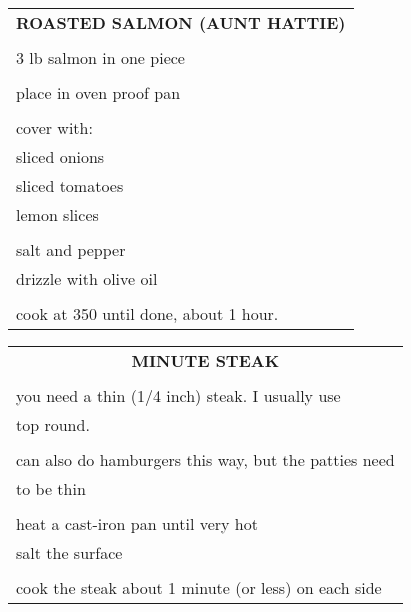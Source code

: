 \documentclass[8pt]{report}
\begin{document}
\begin{tabular}{|l|} \hline	%
 
\multicolumn{1}{|c|}{\textbf{ROASTED SALMON (AUNT HATTIE)}}
\\
\\

\index{fish/meat!roasted salmon (aunt hattie)} \index{roasted salmon}
\index{salmon!roasted}

3 lb salmon in one piece\\
\\
place in oven proof pan\\
\\
cover with:\\
\hspace{0.5 in}	sliced onions\\
\hspace{0.5 in}	sliced tomatoes\\
\hspace{0.5 in}	lemon slices\\
\\
salt and pepper\\
drizzle with olive oil\\
\\
cook at 350 until done, about 1 hour.\\



\hline

\end{tabular}

\newpage


\normalsize

\centering

\begin{tabular}{|l|} \hline	%
 
\multicolumn{1}{|c|}{\textbf{MINUTE STEAK}}
\\
\\

\index{fish/meat!minute steak} \index{minute steak}
\index{steak!minute}

you need a thin (1/4 inch) steak.  I usually use\\
top round.\\
\\
can also do hamburgers this way, but the patties need\\
to be thin\\
\\
heat a cast-iron pan until very hot\\
salt the surface\\
\\
cook the steak about 1 minute (or less) on each side\\



\hline

\end{tabular}
\end{document}
